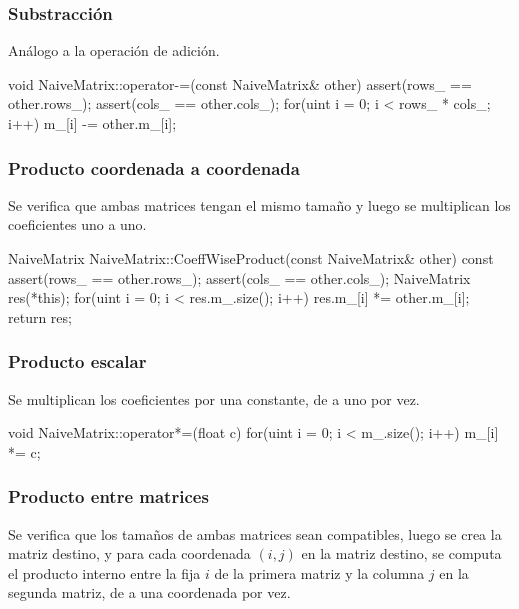 \documentclass[a4paper, 10pt, twoside]{article}
\begin{document}
\subsubsection{Substracción}

Análogo a la operación de adición.

\begin{code}
  void NaiveMatrix::operator-=(const NaiveMatrix& other) {
    assert(rows_ == other.rows_);
    assert(cols_ == other.cols_);
    for(uint i = 0; i < rows_ * cols_; i++) {
      m_[i] -= other.m_[i];
    }
  }
\end{code}


\subsubsection{Producto coordenada a coordenada}

Se verifica que ambas matrices tengan el mismo tamaño y luego se multiplican
los coeficientes uno a uno.

\begin{code}
  NaiveMatrix NaiveMatrix::CoeffWiseProduct(const NaiveMatrix& other) const {
    assert(rows_ == other.rows_);
    assert(cols_ == other.cols_);
    NaiveMatrix res(*this);
    for(uint i = 0; i < res.m_.size(); i++) {
      res.m_[i] *= other.m_[i];
    }
    return res;
  }
\end{code}


\subsubsection{Producto escalar}

Se multiplican los coeficientes por una constante, de a uno por vez.

\begin{code}
  void NaiveMatrix::operator*=(float c) {
    for(uint i = 0; i < m_.size(); i++) {
      m_[i] *= c;
    }
  }
\end{code}


\subsubsection{Producto entre matrices}

Se verifica que los tamaños de ambas matrices sean compatibles, luego se crea
la matriz destino, y para cada coordenada $(i, j)$ en la matriz destino, se
computa el producto interno entre la fija $i$ de la primera matriz y la columna
$j$ en la segunda matriz, de a una coordenada por vez.
\end{document}

